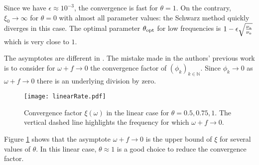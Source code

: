 Since we have $\epsilon \approx 10^{-3}$, 
the convergence is fast for $\theta = 1$.
On the contrary, $\xi_0 \to \infty$ for $\theta = 0$
with almost all parameter values:
the Schwarz method quickly diverges in this case.
%
The optimal parameter $\theta_{\rm opt}$ for low frequencies is $1 - \epsilon\sqrt{\frac{\nu_{\rm a}}{\nu_{\rm o}}}$ which is very close to $1$.
\begin{remark}
	The asymptotes are different in \citep{clement_discrete_2021}.
	The mistake made in the authors' previous work
	is to consider for $\omega+f\rightarrow 0$
	the convergence factor of $(\phi_k)_{k\in \mathbb{N}}$.
	Since $\phi_k\to 0$ as $\omega+f\rightarrow 0$ there
	is an underlying division by zero.
\end{remark}
\begin{figure}
    \centering
    \texttt{[image: linearRate.pdf]}
	\caption{Convergence factor
	$\xi(\omega)$ in the linear case for $\theta=0.5, 0.75, 1$.
	The vertical dashed line highlights the frequency for which
	$\omega+f\rightarrow 0$.}
    \label{fig:OASchwarz_linearRate}
\end{figure}
Figure \ref{fig:OASchwarz_linearRate} shows that the asymptote
$\omega+f\rightarrow 0$ is the upper bound of $\xi$ for several values
of $\theta$. In this linear case, $\theta\approx 1$ is a good choice
to reduce the convergence factor.
